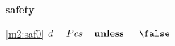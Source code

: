 \textbf{safety}
\begin{block}
\item[ \eqref{m2:saf0} ]{$d = Pcs  \textbf{\quad unless \quad} \false$} %
\end{block}
